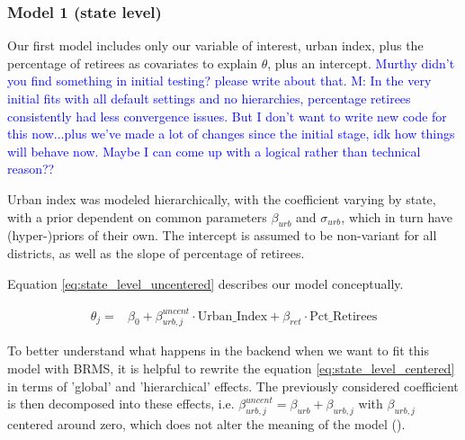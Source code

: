 \documentclass[12pt]{article}
\newcommand{\blue}[1]{\textcolor{blue}{#1}}
\begin{document}
%
%
%
%






\subsubsection*{Model 1 (state level)}


Our first model includes only our variable of interest, urban index, plus the percentage of retirees as covariates to explain $\theta$, plus an intercept.
\blue{ Murthy didn't you find something in initial testing? please write about that.
M: In the very initial fits with all default settings and no hierarchies, percentage retirees consistently had less convergence issues. But I don't want to write new code for this now...plus we've made a lot of changes since the initial stage, idk how things will behave now. Maybe I can come up with a logical rather than technical reason??}

Urban index was modeled hierarchically, with the coefficient varying by state, with a prior dependent on common parameters $\beta_{urb}$ and $\sigma_{urb}$, which in turn have (hyper-)priors of their own. The intercept is assumed to be non-variant for all districts, as well as the slope of percentage of retirees.

Equation \ref{eq:state_level_uncentered} describes our model conceptually.


\begin{equation} \label{eq:state_level_uncentered}
	\begin{aligned}
		\theta_{j} =    &\beta_0 + \beta_{urb,j}^{uncent} \cdot \text{Urban\_Index} + \beta_{ret} \cdot \text{Pct\_Retirees}
	\end{aligned}
\end{equation}

To better understand what happens in the backend when we want to fit this model with BRMS, it is helpful to rewrite the equation \ref{eq:state_level_centered} in terms of 'global' and 'hierarchical' effects. The previously considered coefficient is then decomposed into these effects, i.e.
$\beta_{urb,j}^{uncent} = \beta_{urb} + \beta_{urb,j}$
with $\beta_{urb,j}$ centered around zero, which does not alter the meaning of the model (\cite{brmsbook}).
\end{document}
